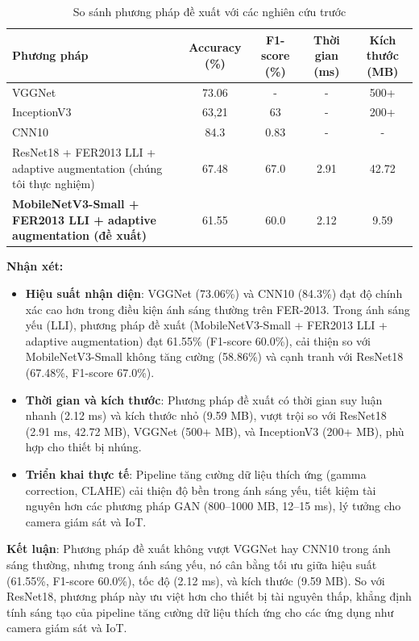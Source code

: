\begin{table}[H]
\centering
\caption{So sánh phương pháp đề xuất với các nghiên cứu trước}
\label{tab:compare_sota}
\begin{tabular}{@{}>{\raggedright\arraybackslash}p{5cm}cccc@{}}
\toprule
\textbf{Phương pháp} & \textbf{Accuracy (\%)} & \textbf{F1-score (\%)} & \textbf{Thời gian (ms)} & \textbf{Kích thước (MB)} \\ \midrule
VGGNet~\cite{khaireddin2021} & 73.06 & - & - & 500+ \\
InceptionV3~\cite{dada2023} & 63,21 & 63 & - & 200+ \\
CNN10~\cite{dada2023} & 84.3 & 0.83 & - & - \\
ResNet18 + FER2013 LLI + adaptive augmentation (chúng tôi thực nghiệm) & 67.48 & 67.0 & 2.91 & 42.72 \\
\textbf{MobileNetV3-Small + FER2013 LLI + adaptive augmentation (đề xuất)} & 61.55 & 60.0 & 2.12 & 9.59 \\ \bottomrule
\end{tabular}
\end{table}

\textbf{Nhận xét:}

\begin{itemize}
    \item \textbf{Hiệu suất nhận diện}: VGGNet (73.06\%) và CNN10 (84.3\%) đạt độ chính xác cao hơn trong điều kiện ánh sáng thường trên FER-2013. Trong ánh sáng yếu (LLI), phương pháp đề xuất (MobileNetV3-Small + FER2013 LLI + adaptive augmentation) đạt 61.55\% (F1-score 60.0\%), cải thiện so với MobileNetV3-Small không tăng cường (58.86\%) và cạnh tranh với ResNet18 (67.48\%, F1-score 67.0\%).
    \item \textbf{Thời gian và kích thước}: Phương pháp đề xuất có thời gian suy luận nhanh (2.12 ms) và kích thước nhỏ (9.59 MB), vượt trội so với ResNet18 (2.91 ms, 42.72 MB), VGGNet (500+ MB), và InceptionV3 (200+ MB), phù hợp cho thiết bị nhúng.
    \item \textbf{Triển khai thực tế}: Pipeline tăng cường dữ liệu thích ứng (gamma correction, CLAHE) cải thiện độ bền trong ánh sáng yếu, tiết kiệm tài nguyên hơn các phương pháp GAN (800–1000 MB, 12–15 ms), lý tưởng cho camera giám sát và IoT.
\end{itemize}

\textbf{Kết luận}: Phương pháp đề xuất không vượt VGGNet hay CNN10 trong ánh sáng thường, nhưng trong ánh sáng yếu, nó cân bằng tối ưu giữa hiệu suất (61.55\%, F1-score 60.0\%), tốc độ (2.12 ms), và kích thước (9.59 MB). So với ResNet18, phương pháp này ưu việt hơn cho thiết bị tài nguyên thấp, khẳng định tính sáng tạo của pipeline tăng cường dữ liệu thích ứng cho các ứng dụng như camera giám sát và IoT.

